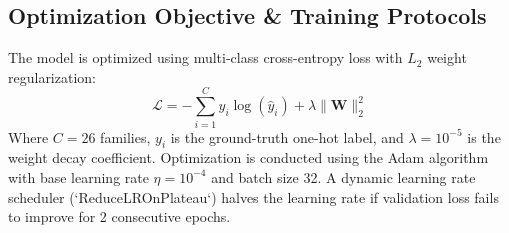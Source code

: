 \documentclass[journal,10pt,twocolumn]{IEEEtran}
\begin{document}
\subsection{Optimization Objective \& Training Protocols}
The model is optimized using multi-class cross-entropy loss with $L_2$ weight regularization:
\begin{equation}
\mathcal{L} = -\sum_{i=1}^C y_i \log(\hat{y}_i) + \lambda \|\mathbf{W}\|_2^2
\end{equation}
Where $C = 26$ families, $y_i$ is the ground-truth one-hot label, and $\lambda = 10^{-5}$ is the weight decay coefficient. Optimization is conducted using the Adam algorithm \cite{kingma2014adam} with base learning rate $\eta = 10^{-4}$ and batch size 32. A dynamic learning rate scheduler (`ReduceLROnPlateau`) halves the learning rate if validation loss fails to improve for 2 consecutive epochs.
\end{document}
